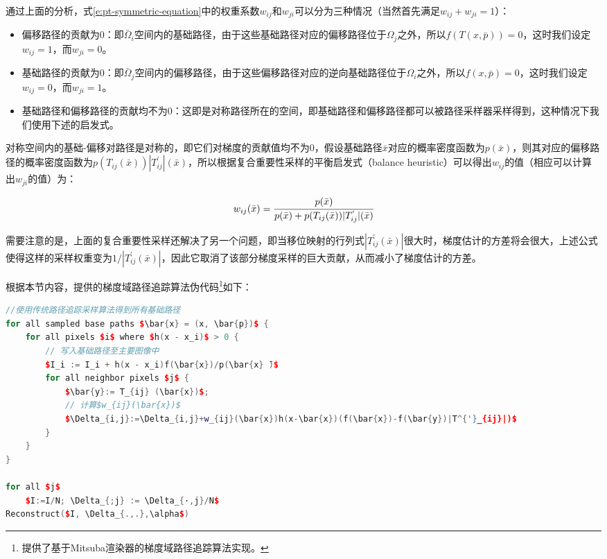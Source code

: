 通过上面的分析，式\ref{e:pt-symmetric-equation}中的权重系数$w_{ij}$和$w_{ji}$可以分为三种情况（当然首先满足$w_{ij}+w_{ji}=1$）：

\begin{itemize}
	\item 偏移路径的贡献为0：即$\bar{\Omega}_i$空间内的基础路径，由于这些基础路径对应的偏移路径位于$\Omega_j$之外，所以$f(T(x,\bar{p}))=0$，这时我们设定$w_{ij}=1$，而$w_{ji}=0$。
	\item 基础路径的贡献为0：即$\bar{\Omega}_j$空间内的偏移路径，由于这些偏移路径对应的逆向基础路径位于$\Omega_i$之外，所以$f(x,\bar{p})=0$，这时我们设定$w_{ij}=0$，而$w_{ji}=1$。
	\item 基础路径和偏移路径的贡献均不为0：这即是对称路径所在的空间，即基础路径和偏移路径都可以被路径采样器采样得到，这种情况下我们使用下述的启发式。
\end{itemize}

对称空间内的基础-偏移对路径是对称的，即它们对梯度的贡献值均不为0，假设基础路径$\bar{x}$对应的概率密度函数为$p(\bar{x})$，则其对应的偏移路径的概率密度函数为$p(T_{ij}(\bar{x}))|T^{'}_{ij}|(\bar{x})$，所以根据复合重要性采样的平衡启发式（balance heuristic）可以得出$w_{ij}$的值（相应可以计算出$w_{ji}$的值）为：

\begin{equation}
	w_{ij}(\bar{x})= \cfrac{p(\bar{x})}{p(\bar{x})+p(T_{ij}(\bar{x}))|T^{'}_{ij}|(\bar{x})}
\end{equation}

\noindent 需要注意的是，上面的复合重要性采样还解决了另一个问题，即当移位映射的行列式$|T^{'}_{ij}(\bar{x})|$很大时，梯度估计的方差将会很大，上述公式使得这样的采样权重变为$1/|T^{'}_{ij}(\bar{x})|$，因此它取消了该部分梯度采样的巨大贡献，从而减小了梯度估计的方差。

根据本节内容，\cite{a:GradientDomainPathTracing}提供的梯度域路径追踪算法伪代码\footnote{\cite{a:GradientdomainpathtracingGPTandgradientdomainbidirectionalpathtracingGBDPTforMitsubarenderer}提供了基于Mitsuba渲染器的梯度域路径追踪算法实现。}如下：

\begin{lstlisting}[language=C++,mathescape]
//使用传统路径追踪采样算法得到所有基础路径
for all sampled base paths $\bar{x} = (x, \bar{p})$ {
	for all pixels $i$ where $h(x - x_i)$ > 0 {
		// 写入基础路径至主要图像中
		$I_i := I_i + h(x - x_i)f(\bar{x})/p(\bar{x} ̄)$
		for all neighbor pixels $j$ {
			$\bar{y}:= T_{ij} (\bar{x})$; 
			// 计算$w_{ij}(\bar{x})$
			$\Delta_{i,j}:=\Delta_{i,j}+w_{ij}(\bar{x})h(x-\bar{x})(f(\bar{x})-f(\bar{y})|T^{'}_{ij}|)$
		}
	}
}
	
for all $j$ 
	$I:=I/N; \Delta_{;j} := \Delta_{·,j}/N$
Reconstruct($I, \Delta_{.,.},\alpha$)
\end{lstlisting}

